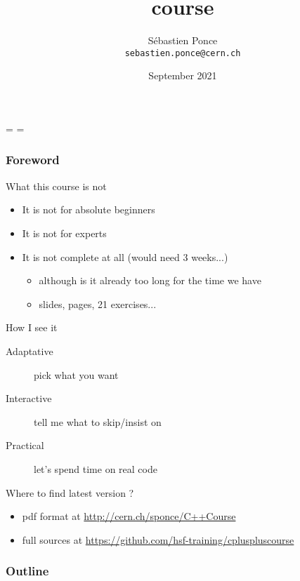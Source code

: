 \documentclass[compress]{beamer}
\title{\cpp course}
\author[S. Ponce]{S\'ebastien Ponce \\ \texttt{sebastien.ponce@cern.ch}}
\institute{CERN}
\date{September 2021}
\begin{document}
\showboxdepth=\maxdimen
\showboxbreadth=\maxdimen


\begin{frame}
  \titlepage
\end{frame}

\begin{frame}
  \frametitle{Foreword}
  \begin{block}{What this course is not}
    \begin{itemize}
    \item It is not for absolute beginners
    \item It is not for experts
    \item It is not complete at all (would need 3 weeks...)
      \begin{itemize}
      \item although is it already too long for the time we have
      \item \inserttotalframenumber{} slides, \insertpresentationendpage{} pages, 21 exercises...
      \end{itemize}
    \end{itemize}
  \end{block}
  \begin{block}{How I see it}
    \begin{description}
    \item[Adaptative] pick what you want
    \item[Interactive] tell me what to skip/insist on
    \item[Practical] let's spend time on real code
    \end{description}
  \end{block}
  \begin{block}{Where to find latest version ?}
    \begin{itemize}
    \item pdf format at {\small \color{blue} \url{http://cern.ch/sponce/C++Course}}
    \item full sources at {\footnotesize \color{blue} \url{https://github.com/hsf-training/cpluspluscourse}}
    \end{itemize}
  \end{block}
\end{frame}

\begin{frame}
  \frametitle{Outline}
  \begin{multicols}{2}
    \tableofcontents[sectionstyle=show,subsectionstyle=hide]
  \end{multicols}
\end{frame}
\end{document}
